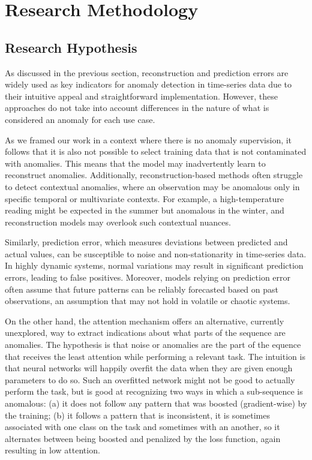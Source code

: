 \documentclass[runningheads]{llncs}
\begin{document}
\section{Research Methodology}
\label{sec:method}

\subsection{Research Hypothesis}
\label{sec:method:hypothesis}

As discussed in the previous section, reconstruction and prediction
errors are widely used as key indicators for anomaly detection in
time-series data due to their intuitive appeal and straightforward
implementation. However, these approaches do not take into account
differences in the nature of what is considered an anomaly for each
use case.

As we framed our work in a context where there is no anomaly
supervision, it follows that it is also not possible to select
training data that is not contaminated with anomalies. This means that
the model may inadvertently learn to reconstruct anomalies.
Additionally, reconstruction-based methods often struggle to detect
contextual anomalies, where an observation may be anomalous only in
specific temporal or multivariate contexts. For example, a
high-temperature reading might be expected in the summer but anomalous
in the winter, and reconstruction models may overlook such contextual
nuances.

Similarly, prediction error, which measures deviations between
predicted and actual values, can be susceptible to noise and
non-stationarity in time-series data. In highly dynamic systems,
normal variations may result in significant prediction errors, leading
to false positives. Moreover, models relying on prediction error often
assume that future patterns can be reliably forecasted based on past
observations, an assumption that may not hold in volatile or chaotic
systems.

On the other hand, the attention mechanism offers an alternative,
currently unexplored, way to extract indications about what parts of
the sequence are anomalies. The hypothesis is that noise or anomalies
are the part of the equence that receives the least attention while
performing a relevant task. The
intuition is that neural networks will happily overfit the data
when they are given enough parameters to do so. Such an overfitted network might
not be good to actually perform the task, but is good at recognizing
two ways in which a sub-sequence is anomalous: (a) it does not follow
any pattern that was boosted (gradient-wise) by the training;
(b) it follows a pattern that is inconsistent, it is sometimes
associated with one class on the task and sometimes with an another,
so it alternates between being boosted and penalized by the loss
function, again resulting in low attention.
\end{document}
